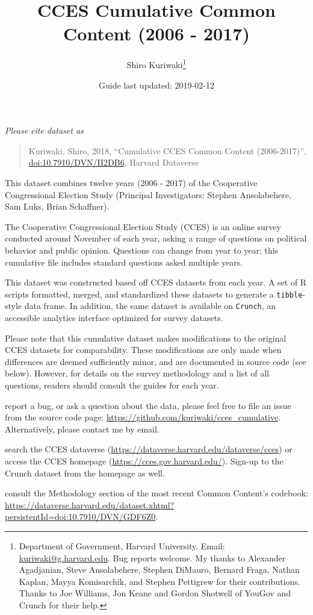 \documentclass[10pt,article,oneside]{memoir}
\title{ \LARGE\textbf{CCES Cumulative Common Content (2006 - 2017)}}
\author{Shiro Kuriwaki\thanks{Department of Government, Harvard University. Email:
\url{kuriwaki@g.harvard.edu}. Bug reports welcome. My thanks to
Alexander Agadjanian, Steve Ansolabehere, Stephen DiMauro, Bernard
Fraga, Nathan Kaplan, Mayya Komisarchik, and Stephen Pettigrew for their
contributions. Thanks to Joe Williams, Jon Keane and Gordon Shotwell of
YouGov and Crunch for their help.}  }
\date{Guide last updated: 2019-02-12}
\theoremstyle{definition}
\begin{document}
\maketitle





\renewcommand\UrlFont{\color{crimson}\ttfamily}

\emph{Please cite dataset as}

\begin{quote}
Kuriwaki, Shiro, 2018, ``Cumulative CCES Common Content (2006-2017)'',
\href{https://dataverse.harvard.edu/dataset.xhtml?persistentId=doi:10.7910/DVN/II2DB6}{\url{doi:10.7910/DVN/II2DB6}},
Harvard Dataverse
\end{quote}

\noindent This dataset combines twelve years (2006 - 2017) of the
Cooperative Congressional Election Study (Principal Investigators:
Stephen Ansolabehere, Sam Luks, Brian Schaffner).

The Cooperative Congressional Election Study (CCES) is an online survey
conducted around November of each year, asking a range of questions on
political behavior and public opinion. Questions can change from year to
year; this cumulative file includes standard questions asked multiple
years.

This dataset was constructed based off CCES datasets from each year. A
set of R scripts formatted, merged, and standardized these datasets to
generate a \texttt{tibble}-style data frame. In addition, the same
dataset is available on \texttt{Crunch}, an accessible analytics
interface optimized for survey datasets.

Please note that this cumulative dataset makes modifications to the
original CCES datasets for comparability. These modifications are only
made when differences are deemed sufficiently minor, and are documented
in source code (see below). However, for details on the survey
methodology and a list of all questions, readers should consult the
guides for each year.

\bigskip

\begin{tcolorbox}[boxrule=0pt,  fonttitle=\bfseries, subtitle style={boxrule=0.4pt, colback=black!75!white}]

report a bug, or ask a question about the data, please feel free to file an issue from the source code page:  \url{https://github.com/kuriwaki/cces_cumulative}. Alternatively, please contact me by email.

search the CCES dataverse (\url{https://dataverse.harvard.edu/dataverse/cces}) or access the CCES homepage (\url{https://cces.gov.harvard.edu/}). Sign-up to the Crunch dataset from the homepage as well.

consult the Methodology section of the most recent Common Content's codebook: \url{https://dataverse.harvard.edu/dataset.xhtml?persistentId=doi:10.7910/DVN/GDF6Z0}.

\end{tcolorbox}
\end{document}
